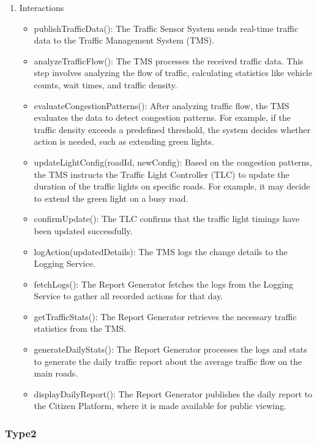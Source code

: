 \documentclass[11.5pt]{article}
\begin{document}
\begin{enumerate}
    \item Interactions
        \begin{itemize}
        \item publishTrafficData(): The Traffic Sensor System sends real-time traffic data to the Traffic Management System (TMS).
        \item analyzeTrafficFlow(): The TMS processes the received traffic data. This step involves analyzing the flow of traffic, calculating statistics like vehicle counts, wait times, and traffic density.
        \item evaluateCongestionPatterns(): After analyzing traffic flow, the TMS evaluates the data to detect congestion patterns. For example, if the traffic density exceeds a predefined threshold, the system decides whether action is needed, such as extending green lights.
        \item updateLightConfig(roadId, newConfig): Based on the congestion patterns, the TMS instructs the Traffic Light Controller (TLC) to update the duration of the traffic lights on specific roads. For example, it may decide to extend the green light on a busy road.
        \item confirmUpdate(): The TLC confirms that the traffic light timings have been updated successfully.
        \item logAction(updatedDetails): The TMS logs the change details to the Logging Service.
        \item fetchLogs(): The Report Generator fetches the logs from the Logging Service to gather all recorded actions for that day.
        \item getTrafficStats(): The Report Generator retrieves the necessary traffic statistics from the TMS. 
        \item generateDailyStats(): The Report Generator processes the logs and stats to generate the daily traffic report about the average traffic flow on the main roads.
        \item displayDailyReport(): The Report Generator publishes the daily report to the Citizen Platform, where it is made available for public viewing.
    \end{itemize}
    \end{enumerate}
    \subsubsection{Type2}

    \newpage
    
\end{document}
